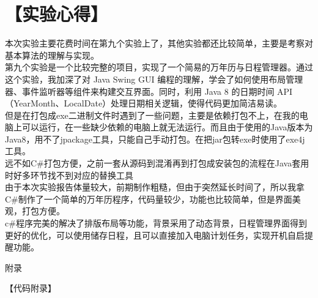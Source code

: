 \documentclass[12pt,a4paper]{article}
\begin{document}
\section*{【实验心得】}
    本次实验主要花费时间在第九个实验上了，其他实验都还比较简单，主要是考察对基本算法的理解与实现。\\

    第九个实验是一个比较完整的项目，实现了一个简易的万年历与日程管理器。通过这个实验，我加深了对 Java Swing GUI 编程的理解，学会了如何使用布局管理器、事件监听器等组件来构建交互界面。同时，利用 Java 8 的日期时间 API（YearMonth、LocalDate）处理日期相关逻辑，使得代码更加简洁易读。\\

    但是在打包成exe二进制文件时遇到了一些问题，主要是依赖打包不上，在我的电脑上可以运行，在一些缺少依赖的电脑上就无法运行。而且由于使用的Java版本为Java8，用不了jpackage工具，只能自己手动打包。在把jar包转exe时使用了exe4j工具。\\

    远不如C\#打包方便，之前一套从源码到混淆再到打包成安装包的流程在Java套用时好多环节找不到对应的替换工具\\

    由于本次实验报告体量较大，前期制作粗糙，但由于突然延长时间了，所以我拿C\#制作了一个简单的万年历程序，代码量较少，功能也比较简单，但是界面美观，打包方便。\\

    c\#程序完美的解决了排版布局等功能，背景采用了动态背景，日程管理界面得到更好的优化，可以使用储存日程，且可以直接加入电脑计划任务，实现开机自启提醒功能。\\
    
    
\newpage
\begin{center}
    {\heiti 附录}
\end{center}
{【代码附录】}\\
\end{document}

